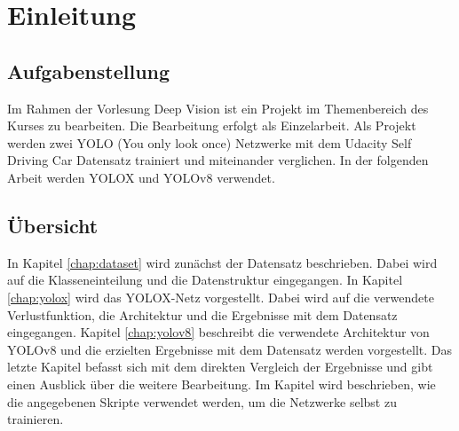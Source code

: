 \chapter{Einleitung}

\section{Aufgabenstellung}
Im Rahmen der Vorlesung Deep Vision ist ein Projekt im Themenbereich des Kurses zu bearbeiten. Die Bearbeitung erfolgt als Einzelarbeit. Als Projekt werden zwei YOLO (You only look once) Netzwerke mit dem Udacity Self Driving Car Datensatz trainiert und miteinander verglichen. In der folgenden Arbeit werden YOLOX und YOLOv8 verwendet.


\section{Übersicht}
In Kapitel \ref{chap:dataset} wird zunächst der Datensatz beschrieben. Dabei wird auf die Klasseneinteilung und die Datenstruktur eingegangen. In Kapitel \ref{chap:yolox} wird das YOLOX-Netz vorgestellt. Dabei wird auf die verwendete Verlustfunktion, die Architektur und die Ergebnisse mit dem Datensatz eingegangen. Kapitel \ref{chap:yolov8} beschreibt die verwendete Architektur von YOLOv8 und die erzielten Ergebnisse mit dem Datensatz werden vorgestellt. Das letzte Kapitel  befasst sich mit dem direkten Vergleich der Ergebnisse und gibt einen Ausblick über die weitere Bearbeitung. Im Kapitel  wird beschrieben, wie die angegebenen Skripte verwendet werden, um die Netzwerke selbst zu trainieren.


